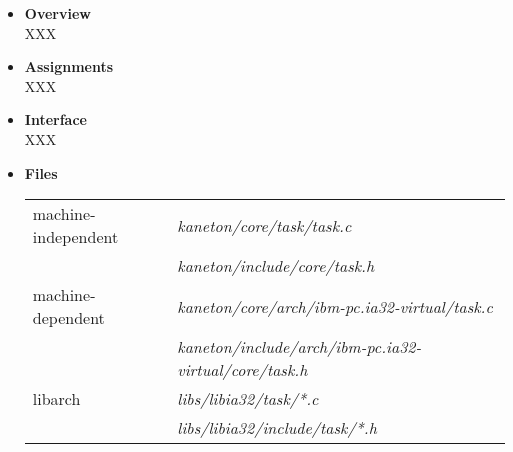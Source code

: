 \begin{itemize}
  \item {\bf Overview}\\

    XXX

  \item {\bf Assignments}\\

    XXX

  \item {\bf Interface}\\

    XXX

  \item {\bf {Files}}\\

    \begin{tabular}{| l | l |}
      \hline
      machine-independent & {\em kaneton/core/task/task.c}\\
      &  {\em kaneton/include/core/task.h}\\\hline
      machine-dependent & {\em kaneton/core/arch/ibm-pc.ia32-virtual/task.c}\\
      & {\em kaneton/include/arch/ibm-pc.ia32-virtual/core/task.h}\\\hline
      libarch & {\em libs/libia32/task/*.c}\\
      & {\em libs/libia32/include/task/*.h}\\\hline
    \end{tabular}
\end{itemize}


%
%

\newpage

